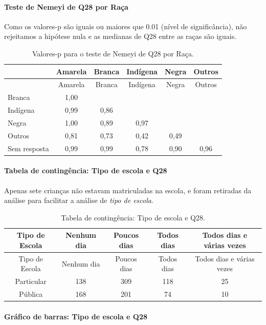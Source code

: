 \documentclass[]{article}
\let\oldparagraph\paragraph
\renewcommand{\paragraph}[1]{\oldparagraph{#1}\mbox{}}
\begin{document}
\hypertarget{teste-de-nemeyi-de-q28-por-rauxe7a}{%
\paragraph{Teste de Nemeyi de Q28 por Raça}\label{teste-de-nemeyi-de-q28-por-rauxe7a}}

Como os valores-p são iguais ou maiores que 0.01 (nível de significância), não rejeitamos a hipótese nula e as medianas de Q28 entre as raças são iguais.

\begin{longtable}[]{@{}lccccc@{}}
\caption{\label{tab:unnamed-chunk-877}Valores-p para o teste de Nemeyi de Q28 por Raça.}\tabularnewline
\toprule
& Amarela & Branca & Indígena & Negra & Outros\tabularnewline
\midrule
\endfirsthead
\toprule
& Amarela & Branca & Indígena & Negra & Outros\tabularnewline
\midrule
\endhead
Branca & 1,00 & & & &\tabularnewline
Indígena & 0,99 & 0,86 & & &\tabularnewline
Negra & 1,00 & 0,89 & 0,97 & &\tabularnewline
Outros & 0,81 & 0,73 & 0,42 & 0,49 &\tabularnewline
Sem resposta & 0,99 & 0,99 & 0,78 & 0,90 & 0,96\tabularnewline
\bottomrule
\end{longtable}

\cleardoublepage

\hypertarget{tabela-de-continguxeancia-tipo-de-escola-e-q28}{%
\paragraph{Tabela de contingência: Tipo de escola e Q28}\label{tabela-de-continguxeancia-tipo-de-escola-e-q28}}

Apenas sete crianças não estavam matriculadas na escola, e foram retiradas da análise para facilitar a análise de \emph{tipo de escola}.

\begin{longtable}[]{@{}ccccc@{}}
\caption{\label{tab:unnamed-chunk-878}Tabela de contingência: Tipo de escola e Q28.}\tabularnewline
\toprule
Tipo de Escola & Nenhum dia & Poucos dias & Todos dias & Todos dias e várias vezes\tabularnewline
\midrule
\endfirsthead
\toprule
Tipo de Escola & Nenhum dia & Poucos dias & Todos dias & Todos dias e várias vezes\tabularnewline
\midrule
\endhead
Particular & 138 & 309 & 118 & 25\tabularnewline
Pública & 168 & 201 & 74 & 10\tabularnewline
\bottomrule
\end{longtable}

\hypertarget{gruxe1fico-de-barras-tipo-de-escola-e-q28}{%
\paragraph{Gráfico de barras: Tipo de escola e Q28}\label{gruxe1fico-de-barras-tipo-de-escola-e-q28}}
\end{document}
